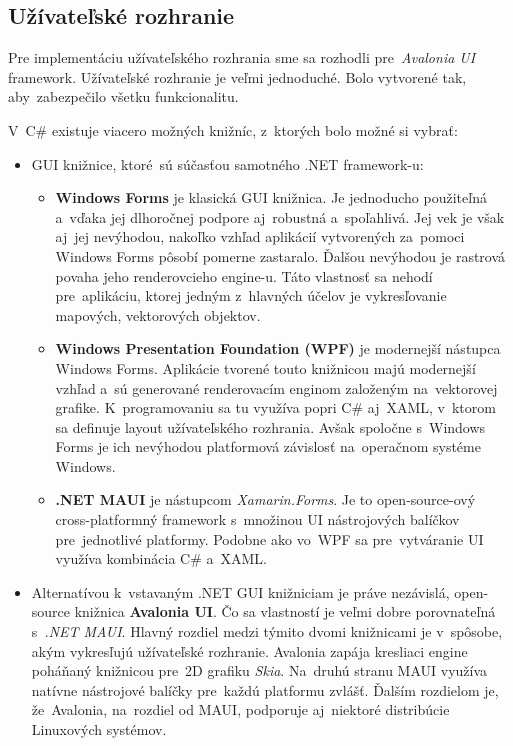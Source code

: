 \subsection{Užívateľské rozhranie}

Pre implementáciu užívateľského rozhrania sme sa rozhodli pre~\textit{Avalonia UI} framework. Užívateľské rozhranie je veľmi jednoduché. Bolo vytvorené tak, aby~zabezpečilo všetku funkcionalitu.

V~C\# existuje viacero možných knižníc, z~ktorých bolo možné si vybrať:
\begin{itemize}
    \item GUI knižnice, ktoré~sú súčasťou samotného .NET framework-u:
    \begin{itemize}
        \item \textbf{Windows Forms} je klasická GUI knižnica. Je jednoducho použiteľná a~vďaka jej dlhoročnej podpore aj~robustná a~spoľahlivá. Jej vek je však aj~jej nevýhodou, nakoľko vzhľad aplikácií vytvorených za~pomoci Windows Forms pôsobí pomerne zastaralo. Ďalšou nevýhodou je rastrová povaha jeho renderovcieho engine-u. Táto vlastnosť sa nehodí pre~aplikáciu, ktorej jedným z~hlavných účelov je vykresľovanie mapových, vektorových objektov.     
        \item \textbf{Windows Presentation Foundation (WPF)} je modernejší nástupca Windows Forms. Aplikácie tvorené touto knižnicou majú modernejší vzhľad a~sú generované renderovacím enginom založeným na~vektorovej grafike. K~programovaniu sa tu využíva popri C\# aj~XAML, v~ktorom sa definuje layout užívateľského rozhrania. Avšak spoločne s~Windows Forms je ich nevýhodou platformová závislosť na~operačnom systéme Windows.
        \item \textbf{.NET MAUI} je nástupcom \textit{Xamarin.Forms}. Je to open-source-ový cross-platformný framework s~množinou UI nástrojových balíčkov pre~jednotlivé platformy. Podobne ako vo~WPF sa pre~vytváranie UI využíva kombinácia C\# a~XAML. 
    \end{itemize}
    \item Alternatívou k~vstavaným .NET GUI knižniciam je práve nezávislá, open-source knižnica \textbf{Avalonia UI}. Čo sa vlastností je veľmi dobre porovnateľná s~\textit{.NET MAUI}. Hlavný rozdiel medzi týmito dvomi knižnicami je v~spôsobe, akým vykresľujú užívateľské rozhranie. Avalonia zapája kresliaci engine poháňaný knižnicou pre~2D grafiku \textit{Skia}. Na~druhú stranu MAUI využíva natívne nástrojové balíčky pre~každú platformu zvlášť. Ďalším rozdielom je, že~Avalonia, na~rozdiel od MAUI, podporuje aj~niektoré distribúcie Linuxových systémov.
\end{itemize}

